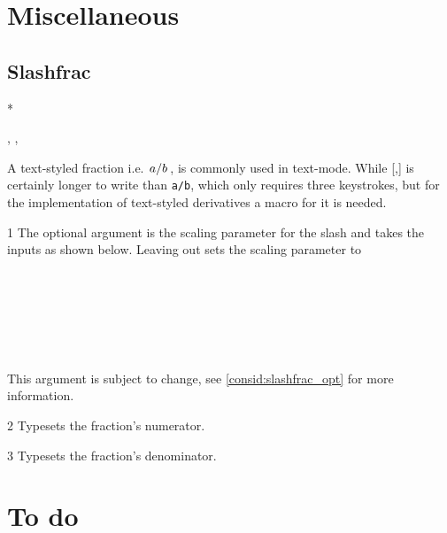 	
	
	\clearpage
	\section{Miscellaneous} 
	
	\subsection{Slashfrac}\label{ssec:slashfrac}
	\begin{function}*{\slashfrac}
		\begin{syntax}
			, , 
		\end{syntax}
		A text-styled fraction i.e. $\slashfrac{a}{b}$, is commonly used in text-mode. While \macro{\slashfrac}[,] is certainly longer to write than \texttt{a/b}, which only requires three keystrokes, but for the implementation of text-styled derivatives a macro for it is needed.
		
		\begin{argument}{1}
			The optional argument is the scaling parameter for the slash and takes the inputs as shown below. Leaving out  sets the scaling parameter to 
			\begin{example}
				 \\
				 \\
				  \\
				  \\
				 \\
			\end{example}
			This argument is subject to change, see \cref{consid:slashfrac_opt} for more information.
		\end{argument}
		
		\begin{argument}{2}
			Typesets the fraction's numerator.
		\end{argument}
		
		\begin{argument}{3}
			Typesets the fraction's denominator.
		\end{argument}
	\end{function}
	
	
	\clearpage
	\section{To do}\label{sec:todo}
	
